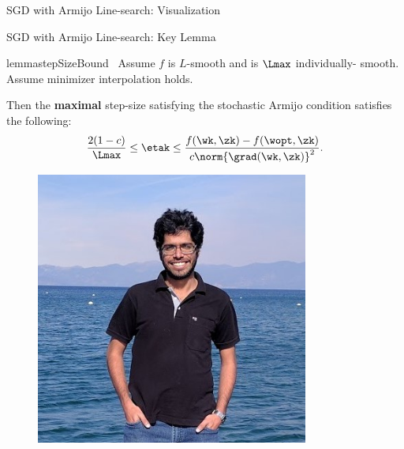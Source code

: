 \documentclass[mathserif,notheorems, hyperref={colorlinks, citecolor=blue, urlcolor=blue, linkcolor=blue}]{beamer}
\def\\{}%
\begin{document}
    \begin{frame}{SGD with Armijo Line-search: Visualization}
        \begin{figure}[]
            \centering
            
        \end{figure} 
    \end{frame}

    \begin{frame}{SGD with Armijo Line-search: Key Lemma}
        \vspace{-2ex}
        \begin{minipage}[t]{0.82\textwidth}
        \vspace{-1.45ex} 
            \begin{restatable}{lemma}{stepSizeBound}~\label{lemma:step-size-bound}
                Assume \( f \) is \( L \)-smooth and \oracle{} is \( \Lmax \) individually- smooth.
                Assume minimizer interpolation holds.\\

                Then the \textbf{maximal} step-size satisfying the stochastic Armijo condition satisfies the following: 
                \[ \frac{2 (1-c)}{\Lmax} \leq \etak \leq \frac{f(\wk, \zk) - f(\wopt, \zk)}{c \norm{\grad(\wk, \zk)}^2}. \]
            \end{restatable}
       \end{minipage} 
       \begin{minipage}[t]{0.15\textwidth}
            \begin{figure}[t]
                \centering
                \includegraphics[width=0.8\textwidth]{collaborators/sharan}


\end{figure}
\end{minipage}
\end{frame}
\end{document}
